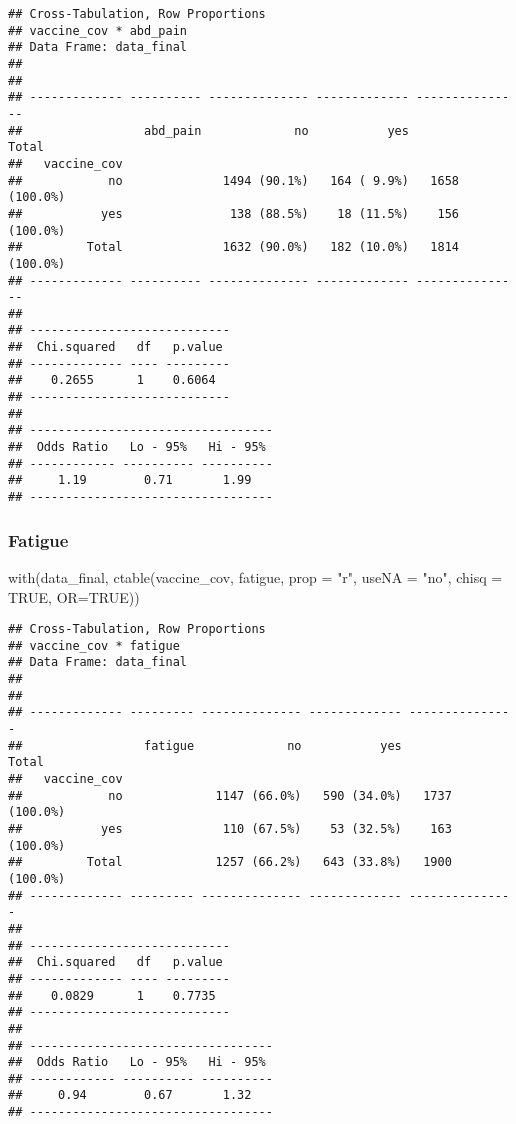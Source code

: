 \documentclass[
]{article}
\newenvironment{Shaded}{\begin{snugshade}}{\end{snugshade}}
\newcommand{\AttributeTok}[1]{\textcolor[rgb]{0.77,0.63,0.00}{#1}}
\newcommand{\ConstantTok}[1]{\textcolor[rgb]{0.00,0.00,0.00}{#1}}
\newcommand{\FunctionTok}[1]{\textcolor[rgb]{0.00,0.00,0.00}{#1}}
\newcommand{\NormalTok}[1]{#1}
\newcommand{\StringTok}[1]{\textcolor[rgb]{0.31,0.60,0.02}{#1}}
\begin{document}
\begin{verbatim}
## Cross-Tabulation, Row Proportions  
## vaccine_cov * abd_pain  
## Data Frame: data_final  
## 
## 
## ------------- ---------- -------------- ------------- ---------------
##                 abd_pain             no           yes           Total
##   vaccine_cov                                                        
##            no              1494 (90.1%)   164 ( 9.9%)   1658 (100.0%)
##           yes               138 (88.5%)    18 (11.5%)    156 (100.0%)
##         Total              1632 (90.0%)   182 (10.0%)   1814 (100.0%)
## ------------- ---------- -------------- ------------- ---------------
## 
## ----------------------------
##  Chi.squared   df   p.value 
## ------------- ---- ---------
##    0.2655      1    0.6064  
## ----------------------------
## 
## ----------------------------------
##  Odds Ratio   Lo - 95%   Hi - 95% 
## ------------ ---------- ----------
##     1.19        0.71       1.99   
## ----------------------------------
\end{verbatim}

\hypertarget{fatigue}{%
\subsubsection{Fatigue}\label{fatigue}}

\begin{Shaded}
\begin{Highlighting}[]
\FunctionTok{with}\NormalTok{(data\_final, }\FunctionTok{ctable}\NormalTok{(vaccine\_cov, fatigue, }\AttributeTok{prop =} \StringTok{"r"}\NormalTok{, }\AttributeTok{useNA =} \StringTok{"no"}\NormalTok{, }\AttributeTok{chisq =} \ConstantTok{TRUE}\NormalTok{, }\AttributeTok{OR=}\ConstantTok{TRUE}\NormalTok{))}
\end{Highlighting}
\end{Shaded}

\begin{verbatim}
## Cross-Tabulation, Row Proportions  
## vaccine_cov * fatigue  
## Data Frame: data_final  
## 
## 
## ------------- --------- -------------- ------------- ---------------
##                 fatigue             no           yes           Total
##   vaccine_cov                                                       
##            no             1147 (66.0%)   590 (34.0%)   1737 (100.0%)
##           yes              110 (67.5%)    53 (32.5%)    163 (100.0%)
##         Total             1257 (66.2%)   643 (33.8%)   1900 (100.0%)
## ------------- --------- -------------- ------------- ---------------
## 
## ----------------------------
##  Chi.squared   df   p.value 
## ------------- ---- ---------
##    0.0829      1    0.7735  
## ----------------------------
## 
## ----------------------------------
##  Odds Ratio   Lo - 95%   Hi - 95% 
## ------------ ---------- ----------
##     0.94        0.67       1.32   
## ----------------------------------
\end{verbatim}
\end{document}

